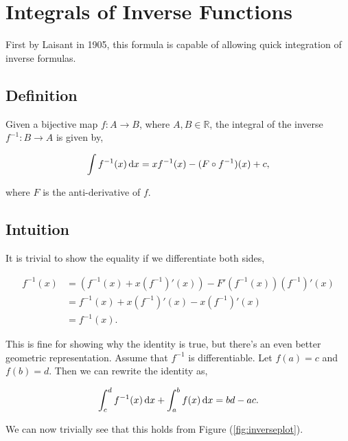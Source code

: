 \section{Integrals of Inverse Functions} \label{sec:inverse}

First by Laisant in 1905, this formula is capable of allowing quick integration of inverse formulas.

\subsection*{Definition}

Given a bijective map $f : A \to B$, where $A, B \in \mathbb R$, the integral of the inverse $f^{-1} : B \to A$ is given by,

$$ \int f^{-1}(x)\,\textrm{d}x = xf^{-1}(x)-(F\circ f^{-1})(x) + c, $$

\noindent where $F$ is the anti-derivative of $f$.

\subsection*{Intuition}

It is trivial to show the equality if we differentiate both sides,

\begin{align*}
    f^{-1}(x) &= (f^{-1}(x) + x(f^{-1})'(x)) - F'(f^{-1}(x))(f^{-1})'(x) \\
    &= f^{-1}(x) + x(f^{-1})'(x) - x(f^{-1})'(x) \\
    &= f^{-1}(x).
\end{align*}

This is fine for showing why the identity is true, but there's an even better geometric representation. Assume that $f^{-1}$ is differentiable. Let $f(a)=c$ and $f(b)=d$. Then we can rewrite the identity as,

$$ \int_c^d f^{-1}(x)\,\textrm{d}x + \int_a^b f(x)\,\textrm{d}x = bd-ac. $$

We can now trivially see that this holds from Figure (\ref{fig:inverseplot}).

